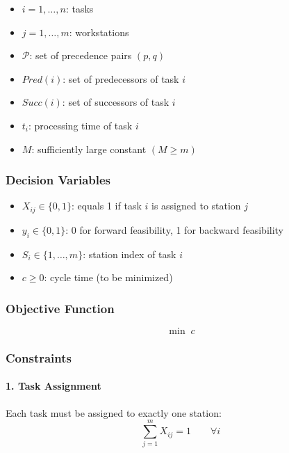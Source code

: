 \documentclass[12pt,a4paper]{article}
\begin{document}
\begin{itemize}
    \item $i = 1,\ldots,n$: tasks
    \item $j = 1,\ldots,m$: workstations
    \item $\mathcal{P}$: set of precedence pairs $(p,q)$
    \item $Pred(i)$: set of predecessors of task $i$
    \item $Succ(i)$: set of successors of task $i$
    \item $t_i$: processing time of task $i$
    \item $M$: sufficiently large constant $(M \ge m)$
\end{itemize}

\subsubsection*{Decision Variables}

\begin{itemize}
    \item $X_{ij} \in \{0,1\}$: equals 1 if task $i$ is assigned to station $j$
    \item $y_i \in \{0,1\}$: 0 for forward feasibility, 1 for backward feasibility
    \item $S_i \in \{1,\ldots,m\}$: station index of task $i$
    \item $c \ge 0$: cycle time (to be minimized)
\end{itemize}

\subsubsection*{Objective Function}

\begin{equation}
\min \; c
\end{equation}

\subsubsection*{Constraints}

\paragraph{1. Task Assignment}
Each task must be assigned to exactly one station:
\begin{equation}
\sum_{j=1}^{m} X_{ij} = 1 \qquad \forall i
\end{equation}
\end{document}
